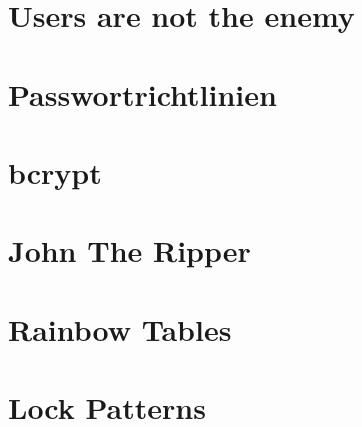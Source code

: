
\def \Uebungsblatt {01}


	
 
	\section{Users are not the enemy}
	
	\section{Passwortrichtlinien}
	
	\section{bcrypt}
	\section{John The Ripper}
	
	\section{Rainbow Tables}
	\section{Lock Patterns}
	

